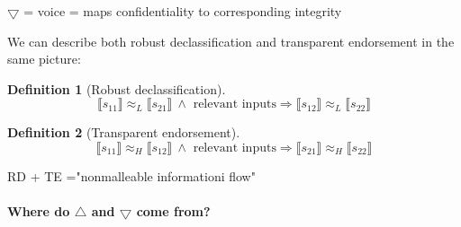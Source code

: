 \documentclass{article}
\newtheorem{definition}{Definition}[theorem]
\begin{document}
\begin{prooftree}
\end{prooftree}

$\bigtriangledown$ = voice = maps confidentiality to corresponding integrity

We can describe both robust declassification and transparent endorsement in the same picture:



\begin{definition}[Robust declassification]  
\begin{equation*}
  \llbracket s_{11} \rrbracket \approx_L \llbracket s_{21} \rrbracket \ \land \text{ relevant inputs} \Rightarrow \llbracket s_{12} \rrbracket \approx_L \llbracket s_{22} \rrbracket 
\end{equation*}
\end{definition}


\begin{definition}[Transparent endorsement]
\begin{equation*}
  \llbracket s_{11} \rrbracket \approx_H \llbracket s_{12} \rrbracket \ \land \text{ relevant inputs} \Rightarrow \llbracket s_{21} \rrbracket \approx_H \llbracket s_{22} \rrbracket
\end{equation*}  
\end{definition}  

RD + TE ="nonmalleable informationi flow"

\paragraph{Where do $\bigtriangleup$ and $\bigtriangledown$ come from?}\ 
\end{document}
